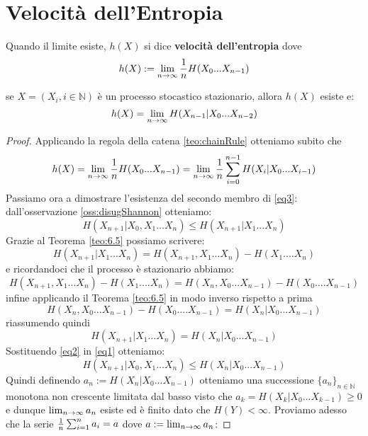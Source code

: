 \section{Velocità dell'Entropia}
\label{sec:EntropyRate}
\begin{defi}
Quando il limite esiste, $h(X)$ si dice \textbf{velocità dell'entropia} dove
$$h(X):=\lim_{n\to \infty}\frac{1}{n}H(X_0...X_{n-1})$$
\end{defi}

\begin{teo}\label{teo:10.10}
se $X=(X_i,i\in \mathbb{N})$ è un processo stocastico stazionario, allora $h(X)$ esiste e:
\begin{equation} \label{eq3}
h(X)=\lim_{n\to \infty} H(X_{n-1}|X_0...X_{n-2})
\end{equation}
\end{teo}
\begin{proof}
Applicando la regola della catena \ref{teo:chainRule} otteniamo subito che
\begin{equation}\label{eq4}
h(X)=\lim_{n\to \infty} \frac{1}{n} H(X_0...X_{n-1})= \lim_{n\to \infty} \frac{1}{n} \sum_{i=0}^{n-1}H(X_i|X_0...X_{i-1})
\end{equation}
Passiamo ora a dimostrare l'esistenza del secondo membro di \ref{eq3}:\\
dall'osservazione \ref{oss:disugShannon} otteniamo:
\begin{equation} \label{eq1}
H(X_{n+1}|X_0,X_1...X_n) \leq H(X_{n+1}|X_1...X_n)
\end{equation}
Grazie al Teorema \ref{teo:6.5} possiamo scrivere:
$$H(X_{n+1}|X_1...X_n)=H(X_{n+1},X_1...X_n) - H(X_1....X_n)$$
e ricordandoci che il processo è stazionario abbiamo:
$$H(X_{n+1},X_1...X_n) - H(X_1....X_n)= H(X_{n},X_0...X_{n-1}) - H(X_0....X_{n-1})$$
infine applicando il Teorema \ref{teo:6.5} in modo inverso rispetto a prima
$$H(X_{n},X_0...X_{n-1}) - H(X_0....X_{n-1})=H(X_{n}|X_0...X_{n-1})$$
riassumendo quindi
\begin{equation} \label{eq2}
H(X_{n+1}|X_1...X_n)=H(X_{n}|X_0...X_{n-1})
\end{equation}
Sostituendo \ref{eq2} in \ref{eq1} otteniamo:
\begin{equation}
H(X_{n+1}|X_0,X_1...X_n) \leq H(X_{n}|X_0...X_{n-1})
\end{equation}
Quindi definendo $a_n :=  H(X_{n}|X_0...X_{n-1})$ otteniamo una successione $\{ a_n \}_{n\in \mathbb{N}}$ monotona non crescente limitata dal basso visto che $a_k=H(X_{k}|X_0...X_{k-1})\geq 0$ e dunque $\lim_{n\to \infty} a_n$ esiste ed è finito dato che $H(Y)<\infty$.
Proviamo adesso che la serie $\frac{1}{n} \sum_{i=1}^n a_i = a$ dove $a:=\lim_{n\to \infty} a_n$:

\end{proof}
